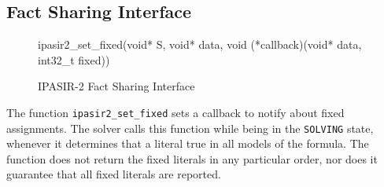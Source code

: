 \documentclass[sat]{iosart2x}
\begin{document}
\subsection{Fact Sharing Interface}

\begin{figure}[h]
\tt\raggedright
ipasir2\_set\_fixed(void* S, void* data, void (*callback)(void* data, int32\_t fixed))
\caption{IPASIR-2 Fact Sharing Interface}
\end{figure}

The function \texttt{ipasir2\_set\_fixed} sets a callback to notify about fixed assignments.
The solver calls this function while being in the \texttt{SOLVING} state, whenever it determines that a literal true in all models of the formula.
The function does not return the fixed literals in any particular order, nor does it guarantee that all fixed literals are reported.



\end{document}
